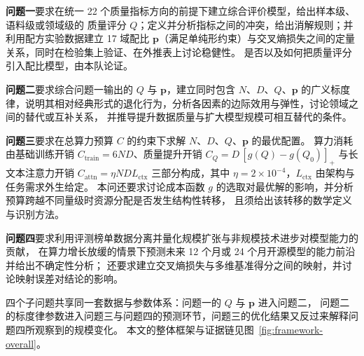 \textbf{问题一}要求在统一 22 个质量指标方向的前提下建立综合评价模型，给出样本级、语料级或领域级的
质量评分 $Q$；定义并分析指标之间的冲突，给出消解规则；并利用配方实验数据建立 17 域配比
$\boldsymbol{p}$（满足单纯形约束）与交叉熵损失之间的定量关系，同时在检验集上验证、在外推表上讨论稳健性。
是否以及如何把质量评分引入配比模型，由本队论证。

\textbf{问题二}要求综合问题一输出的 $Q$ 与 $\boldsymbol{p}$，建立同时包含 $N$、$D$、$Q$、$\boldsymbol{p}$
的广义标度律，说明其相对经典形式的退化行为，分析各因素的边际效用与弹性，讨论领域之间的替代或互补关系，
并推导提升数据质量与扩大模型规模可相互替代的条件。

\textbf{问题三}要求在总算力预算 $C$ 的约束下求解 $N$、$D$、$Q$、$\boldsymbol{p}$ 的最优配置。
算力消耗由基础训练开销 $C_{\text{train}}=6ND$、质量提升开销
$C_{Q}=D\,[g(Q)-g(Q_{0})]_{+}$ 与长文本注意力开销 $C_{\text{attn}}=\eta N D L_{\text{ctx}}$
三部分构成，其中 $\eta=2\times10^{-4}$，$L_{\text{ctx}}$ 由架构与任务需求外生给定。
本问还要求讨论成本函数 $g$ 的选取对最优解的影响，并分析预算跨越不同量级时资源分配是否发生结构性转移，
且须给出该转移的数学定义与识别方法。

\textbf{问题四}要求利用评测榜单数据分离并量化规模扩张与非规模技术进步对模型能力的贡献，
在算力增长放缓的情景下预测未来 12 个月或 24 个月开源模型的能力前沿并给出不确定性分析；
还要求建立交叉熵损失与多维基准得分之间的映射，并讨论映射误差对结论的影响。

四个子问题共享同一套数据与参数体系：问题一的 $Q$ 与 $\boldsymbol{p}$ 进入问题二，
问题二的标度律参数进入问题三与问题四的预测环节，问题三的优化结果又反过来解释问题四所观察到的规模变化。
本文的整体框架与证据链见图~\ref{fig:framework-overall}。
